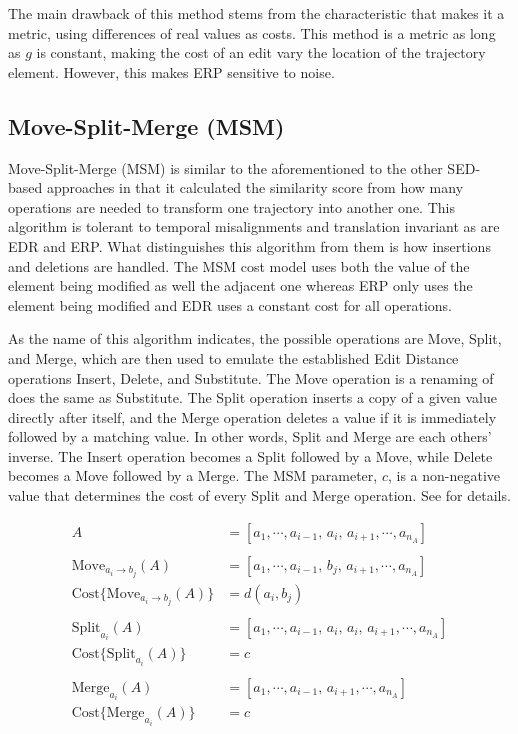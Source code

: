 The main drawback of this method stems from the characteristic that makes it a metric, using differences of real values as costs.
This method is a metric as long as $g$ is constant, making the cost of an edit vary the location of the trajectory element. 
However, this makes ERP sensitive to noise\cite{12-RobustFast}. 


\clearpage
\subsection{Move-Split-Merge (MSM)}
Move-Split-Merge (MSM) \cite{40-MoveSplitMergeMetric} is similar to the aforementioned to the other SED-based approaches in that it calculated the similarity score from how many operations are needed to transform one trajectory into another one.
This algorithm is tolerant to temporal misalignments and translation invariant\cite{53-TimeSeries} as are EDR and ERP.  
What distinguishes this algorithm from them is how insertions and deletions are handled.
The MSM cost model uses both the value of the element being modified as well the adjacent one whereas ERP only uses the element being modified and EDR uses a constant cost for all operations. 


As the name of this algorithm indicates, the possible operations are Move, Split, and Merge, which are then used to emulate the established Edit Distance operations Insert, Delete, and Substitute.
The Move operation is a renaming of does the same as Substitute.
The Split operation inserts a copy of a given value directly after itself, and the Merge operation deletes a value if it is immediately followed by a matching value\cite{53-TimeSeries}. In other words, Split and Merge are each others’ inverse.
The Insert operation becomes a Split followed by a Move, while Delete becomes a Move followed by a Merge. 
The MSM parameter, $c$, is  a non-negative value that determines the cost of every Split and Merge operation. See  for details. 

\begin{align}
 A  &= [a_1, \cdots , a_{i-1},\, a_i,\, a_{i+1}, \cdots  , a_{n_A}] \nonumber \\
 \nonumber\\
\text{Move}_{a_i \rightarrow b_j}(A)  &= [a_1, \cdots , a_{i-1},\, b_j,\, a_{i+1}, \cdots  , a_{n_A}] \label{eq:msm-start} \\
\text{Cost} \big\{ \text{Move}_{a_i \rightarrow b_j}(A) \big\} &= d(a_i, b_j) \\
\nonumber \\
\text{Split}_{a_i}(A) &= [a_1, \cdots , a_{i-1},\,a_i,\, a_i,\, a_{i+1}, \cdots  , a_{n_A}]\\
\text{Cost} \big\{ \text{Split}_{a_i}(A) \big\} &= c \\
\nonumber \\
\text{Merge}_{a_i}(A) &= [a_1, \cdots , a_{i-1},\, a_{i+1}, \cdots , a_{n_A}] \\
\text{Cost} \big\{ \text{Merge}_{a_i}(A) \big\} &= c \label{eq:msm-end}
\end{align}

